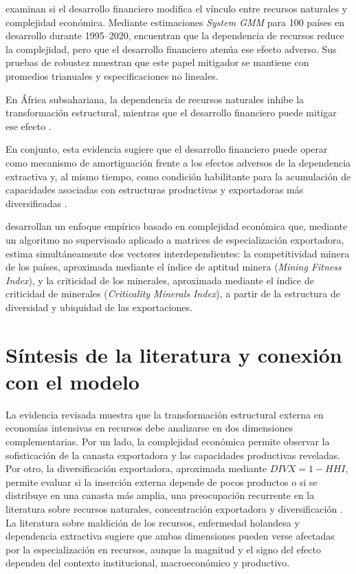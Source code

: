 \documentclass[../../PTFM.tex]{subfiles}
\begin{document}
	\textcite{Valentine2024} examinan si el desarrollo financiero modifica el vínculo entre recursos naturales y complejidad económica. Mediante estimaciones \textit{System GMM} para 100 países en desarrollo durante 1995--2020, encuentran que la dependencia de recursos reduce la complejidad, pero que el desarrollo financiero atenúa ese efecto adverso. Sus pruebas de robustez muestran que este papel mitigador se mantiene con promedios trianuales y especificaciones no lineales.
	
	En África subsahariana, la dependencia de recursos naturales inhibe la transformación estructural, mientras que el desarrollo financiero puede mitigar ese efecto \parencite{Nwani2023}.
	
	En conjunto, esta evidencia sugiere que el desarrollo financiero puede operar como mecanismo de amortiguación frente a los efectos adversos de la dependencia extractiva y, al mismo tiempo, como condición habilitante para la acumulación de capacidades asociadas con estructuras productivas y exportadoras más diversificadas \parencite{Valentine2024,Nieminen2020,Nwani2023,Lashitew2021}.
	
	\textcite{ValverdeCarbonell2023} desarrollan un enfoque empírico basado en complejidad económica que, mediante un algoritmo no supervisado aplicado a matrices de especialización exportadora, estima simultáneamente dos vectores interdependientes: la competitividad minera de los países, aproximada mediante el índice de aptitud minera (\textit{Mining Fitness Index}), y la criticidad de los minerales, aproximada mediante el índice de criticidad de minerales (\textit{Criticality Minerals Index}), a partir de la estructura de diversidad y ubiquidad de las exportaciones.

	\section{Síntesis de la literatura y conexión con el modelo}
	\label{sec:sintesis-literatura-modelo}

	La evidencia revisada muestra que la transformación estructural externa en economías intensivas en recursos debe analizarse en dos dimensiones complementarias. Por un lado, la complejidad económica permite observar la sofisticación de la canasta exportadora y las capacidades productivas reveladas. Por otro, la diversificación exportadora, aproximada mediante $DIVX=1-HHI$, permite evaluar si la inserción externa depende de pocos productos o si se distribuye en una canasta más amplia, una preocupación recurrente en la literatura sobre recursos naturales, concentración exportadora y diversificación \parencite{Harding2016,Bahar2018,Joya2015,Lashitew2021}. La literatura sobre maldición de los recursos, enfermedad holandesa y dependencia extractiva sugiere que ambas dimensiones pueden verse afectadas por la especialización en recursos, aunque la magnitud y el signo del efecto dependen del contexto institucional, macroeconómico y productivo.
\end{document}
